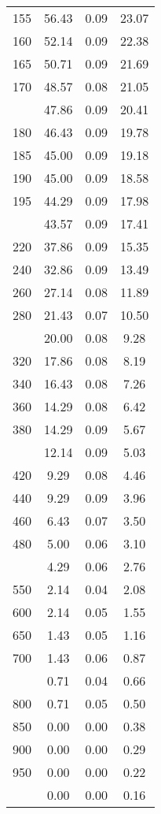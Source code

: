 \begin{table}[ht]
\begin{tabular}{lccc}
  155 & 56.43 & 0.09 & 23.07 \\ 
  160 & 52.14 & 0.09 & 22.38 \\ 
  165 & 50.71 & 0.09 & 21.69 \\ 
  170 & 48.57 & 0.08 & 21.05 \\ 
   \addlinespace
175 & 47.86 & 0.09 & 20.41 \\ 
  180 & 46.43 & 0.09 & 19.78 \\ 
  185 & 45.00 & 0.09 & 19.18 \\ 
  190 & 45.00 & 0.09 & 18.58 \\ 
  195 & 44.29 & 0.09 & 17.98 \\ 
   \addlinespace
200 & 43.57 & 0.09 & 17.41 \\ 
  220 & 37.86 & 0.09 & 15.35 \\ 
  240 & 32.86 & 0.09 & 13.49 \\ 
  260 & 27.14 & 0.08 & 11.89 \\ 
  280 & 21.43 & 0.07 & 10.50 \\ 
   \addlinespace
300 & 20.00 & 0.08 & 9.28 \\ 
  320 & 17.86 & 0.08 & 8.19 \\ 
  340 & 16.43 & 0.08 & 7.26 \\ 
  360 & 14.29 & 0.08 & 6.42 \\ 
  380 & 14.29 & 0.09 & 5.67 \\ 
   \addlinespace
400 & 12.14 & 0.09 & 5.03 \\ 
  420 & 9.29 & 0.08 & 4.46 \\ 
  440 & 9.29 & 0.09 & 3.96 \\ 
  460 & 6.43 & 0.07 & 3.50 \\ 
  480 & 5.00 & 0.06 & 3.10 \\ 
   \addlinespace
500 & 4.29 & 0.06 & 2.76 \\ 
  550 & 2.14 & 0.04 & 2.08 \\ 
  600 & 2.14 & 0.05 & 1.55 \\ 
  650 & 1.43 & 0.05 & 1.16 \\ 
  700 & 1.43 & 0.06 & 0.87 \\ 
   \addlinespace
750 & 0.71 & 0.04 & 0.66 \\ 
  800 & 0.71 & 0.05 & 0.50 \\ 
  850 & 0.00 & 0.00 & 0.38 \\ 
  900 & 0.00 & 0.00 & 0.29 \\ 
  950 & 0.00 & 0.00 & 0.22 \\ 
   \addlinespace
1000 & 0.00 & 0.00 & 0.16 \\ 
   \bottomrule
\end{tabular}
\end{table}
